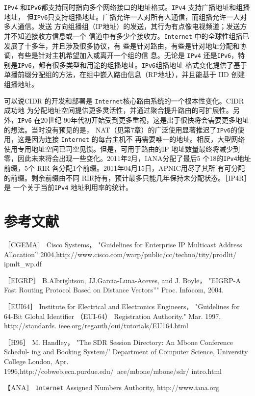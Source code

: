 \verb|IPv4| 和\verb|IPv6|都支持同时指向多个网络接口的地址格式。\verb|IPv4| 支持广播地址和组播地址，
但\verb|IPv6|只支持组播地址。广播允许一人对所有人通信，而组播允许一人对多人通信。发送
方向组播组（IP地址）的发送，其行为有点像电视频道；发送方并不知道接收方信息或一个
信道中有多少个接收方。\verb|Internet| 中的全球性组播已发展了十多年，并且涉及很多协议，有
些是针对路由，有些是针对地址分配和协调，有些是针对主机希望加入或离开一个组的信
息。无论是 \verb|IPv4| 还是\verb|IPv6|，特别是\verb|IPv6|，都有很多类型和用途的组播地址。\verb|IPv6|组播地址
格式变化提供了基于单播前缀分配组的方法，在组中嵌入路由信息（RP地址），并且能基于
IID 创建组播地址。

可以说CIDR 的开发和部署是 \verb|Internet|核心路由系统的一个根本性变化。CIDR 成功地
为分配地址空间提供更多灵活性，并通过聚合提升路由的可扩展性。另外，\verb|IPv6| 在20世纪
90年代初开始受到更多重视，这是出于很快将会需要更多地址的想法。当时没有预见的是，
NAT（见第7章）的广泛使用显著推迟了\verb|IPv6|的使用，这是因为连接 \verb|Internet| 的每台主机不
再需要唯一的地址。相反，大型网络使用专用地址空间已司空见惯。但是，可用于路由的IP
地址数量最终将减少到零，因此未来将会出现一些变化。2011年2月，IANA分配了最后5
个18的\verb|IPv4|地址前缀，5个 RIR 各分配1个前缀。2011年04月15日，APNIC用尽了其所
有可分配的前缀。剩余前缀由不同 RIR持有，预计最多只能几年保持未分配状态。［IP4R］ 是
一个关于当前\verb|IPv4| 地址利用率的统计。

\section{参考文献}
［CGEMA］ Cisco Systems， "Guidelines for Enterprise IP Multicast Address
Allocation” 2004,http://www.cisco.com/warp/public/cc/techno/tity/prodlit/
ipmlt\_wp.df

［EIGRP］ B.Albrightson, JJ.Garcia-Luna-Aceves, and J. Boyle， "EIGRP-A Fast
Routing Protocol Based on Distance Vectors”" Proc. Infocom, 2004.

［EUI64］ Institute for Electrical and Electronics Engineers， "Guidelines for 64-Bit
Global Identifier （EUI-64） Registration Authority." Mar. 1997, http://standards.
ieee.org/regauth/oui/tutorials/EU164.html

［H96］ M. Handley， "The SDR Session Directory: An Mbone Conference Schedul-
ing and Booking System/' Department of Computer Science, University College
London, Apr. 1996,http://cobweb.ecn.purdue.edu/~ace/mbone/mbone/sdr/
intro.html

【ANA］ \verb|Internet| Assigned Numbers Authority, http://www.iana.org

